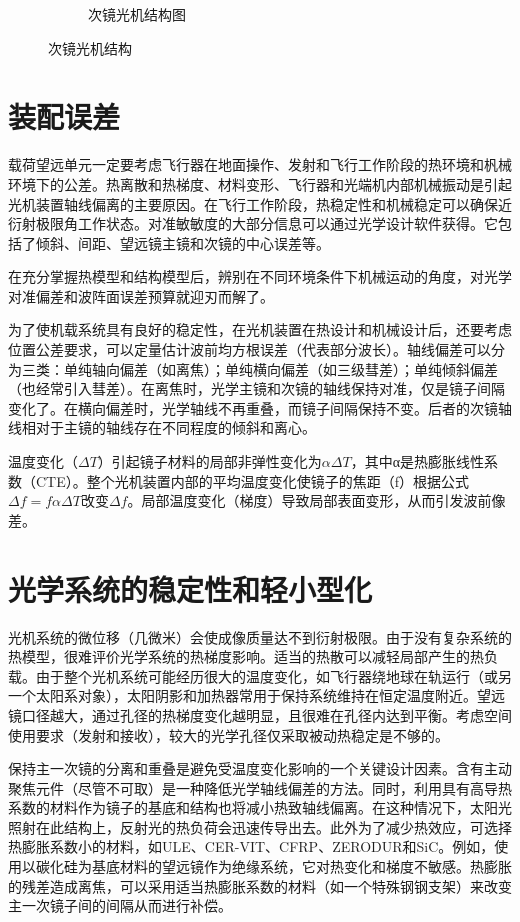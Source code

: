 \begin{figure}[!htbp]
\begin{subfigure}[c]{0.5\textwidth}
		\caption{次镜光机结构图}
		\label{RCcijing002.png}
	\end{subfigure}
	\caption{次镜光机结构}
	\label{fig:Second-MIRROR}
\end{figure}

\section{装配误差}
载荷望远单元一定要考虑飞行器在地面操作、发射和飞行工作阶段的热环境和杋械环境下的公差。热离散和热梯度、材料变形、飞行器和光端机内部机械振动是引起光机装置轴线偏离的主要原因。在飞行工作阶段，热稳定性和机械稳定可以确保近衍射极限角工作状态。对准敏敏度的大部分信息可以通过光学设计软件获得。它包括了倾斜、间距、望远镜主镜和次镜的中心误差等。

在充分掌握热模型和结构模型后，辨别在不同环境条件下机械运动的角度，对光学对准偏差和波阵面误差预算就迎刃而解了。

为了使机载系统具有良好的稳定性，在光机装置在热设计和机械设计后，还要考虑位置公差要求，可以定量估计波前均方根误差（代表部分波长）。轴线偏差可以分为三类：单纯轴向偏差（如离焦）；单纯横向偏差（如三级彗差）；单纯倾斜偏差（也经常引入彗差）。在离焦时，光学主镜和次镜的轴线保持对准，仅是镜子间隔变化了。在横向偏差时，光学轴线不再重叠，而镜子间隔保持不变。后者的次镜轴线相对于主镜的轴线存在不同程度的倾斜和离心。

温度变化（$\Delta T$）引起镜子材料的局部非弹性变化为$\alpha \Delta T$，其中α是热膨胀线性系数（CTE）。整个光机装置内部的平均温度变化使镜子的焦距（f）根据公式$\Delta f = f\alpha \Delta T$改变$\Delta f $。局部温度变化（梯度）导致局部表面变形，从而引发波前像差。

\section{光学系统的稳定性和轻小型化}
光机系统的微位移（几微米）会使成像质量达不到衍射极限。由于没有复杂系统的热模型，很难评价光学系统的热梯度影响。适当的热散可以减轻局部产生的热负载。由于整个光机系统可能经历很大的温度变化，如飞行器绕地球在轨运行（或另一个太阳系对象），太阳阴影和加热器常用于保持系统维持在恒定温度附近。望远镜口径越大，通过孔径的热梯度变化越明显，且很难在孔径内达到平衡。考虑空间使用要求（发射和接收），较大的光学孔径仅采取被动热稳定是不够的。

保持主一次镜的分离和重叠是避免受温度变化影响的一个关键设计因素。含有主动聚焦元件（尽管不可取）是一种降低光学轴线偏差的方法。同时，利用具有高导热系数的材料作为镜子的基底和结构也将减小热致轴线偏离。在这种情况下，太阳光照射在此结构上，反射光的热负荷会迅速传导出去。此外为了减少热效应，可选择热膨胀系数小的材料，如ULE、CER-VIT、CFRP、ZERODUR和SiC。例如，使用以碳化硅为基底材料的望远镜作为绝缘系统，它对热变化和梯度不敏感。热膨胀的残差造成离焦，可以采用适当热膨胀系数的材料（如一个特殊钢钢支架）来改变主一次镜子间的间隔从而进行补偿。


